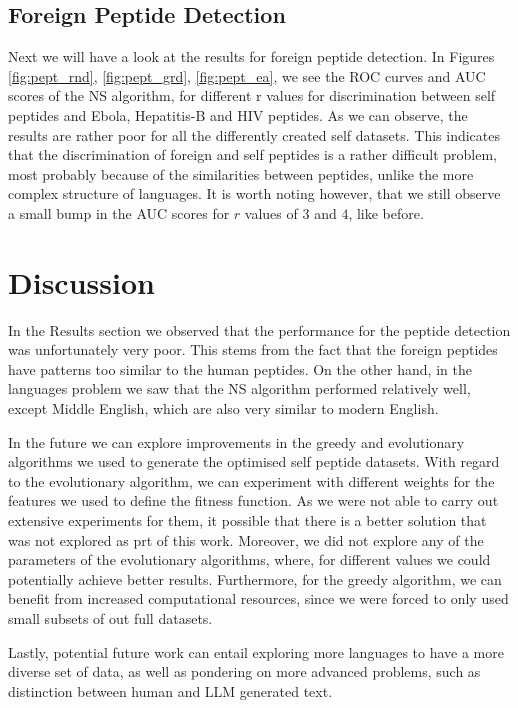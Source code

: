 \documentclass{article}
\begin{document}
\subsection{Foreign Peptide Detection}
Next we will have a look at the results for foreign peptide detection. In Figures \ref{fig:pept_rnd}, \ref{fig:pept_grd}, 
\ref{fig:pept_ea},  we see the ROC curves and AUC scores of the NS algorithm, for different r values for discrimination 
between self peptides and Ebola, Hepatitis-B and HIV peptides. As we can observe, the results are rather poor for all 
the differently created self datasets. This indicates that the discrimination of foreign and self peptides is a rather 
difficult problem, most probably because of the similarities between peptides, unlike the more complex structure of 
languages. It is worth noting however, that we still observe a small bump in the AUC scores for $r$ values of $3$ and 
$4$, like before.

\section{Discussion}
In the Results section we observed that the performance for the peptide detection was unfortunately very poor. This stems
from the fact that the foreign peptides have patterns too similar to the human peptides. On the other hand, in the 
languages problem we saw that the NS algorithm performed relatively well, except Middle English, which are also very 
similar to modern English. 

In the future we can explore improvements in the greedy and evolutionary algorithms we used to generate the optimised 
self peptide datasets. With regard to the evolutionary algorithm, we can experiment with different weights for the
features we used to define the fitness function. As we were not able to carry out extensive experiments for them, it 
possible that there is a better solution that was not explored as prt of this work. Moreover, we did not explore any
of the parameters of the evolutionary algorithms, where, for different values we could potentially achieve better
results. Furthermore, for the greedy algorithm, we can benefit from increased computational resources, since we were 
forced to only used small subsets of out full datasets.

Lastly, potential future work can entail exploring more languages to have a more diverse set of data, as well as pondering 
on more advanced problems, such as distinction between human and LLM generated text.
\end{document}
